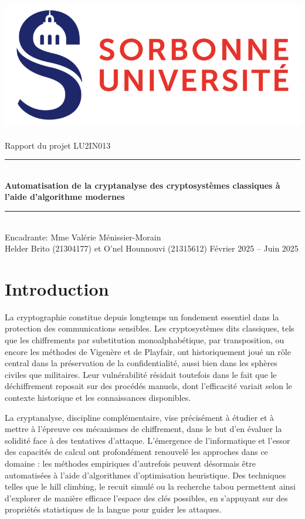\documentclass[a4paper]{article}
\begin{document}
\thispagestyle{plain} 
\begin{titlepage} 
    \begin{center} 
        \bigskip 
        \includegraphics[scale=0.5]{logo_su.jpg}~\\[4cm] 
        {\LARGE Rapport du projet LU2IN013}\\[0.3cm] 
        \rule{\linewidth}{0.5mm} \\[0.6cm] 
        {\huge \textbf{Automatisation de la cryptanalyse des cryptosystèmes classiques à l'aide d'algorithme modernes}}\\[0.4cm] 
        \rule{\linewidth}{0.5mm} \\[1cm] {\large Encadrante: Mme Valérie Ménissier-Morain}\\[4cm] 
        {\Large Helder Brito (21304177) et O'nel Hounnouvi (21315612) }
        \vfill Février 2025 -- Juin 2025
    \end{center} 
\end{titlepage}

\newpage

\tableofcontents

\newpage

\section{Introduction}
La cryptographie constitue depuis longtemps un fondement essentiel dans la protection des communications sensibles. Les cryptosystèmes dits classiques, tels que les chiffrements par substitution monoalphabétique, par transposition, ou encore les méthodes de Vigenère et de Playfair, ont historiquement joué un rôle central dans la préservation de la confidentialité, aussi bien dans les sphères civiles que militaires. Leur vulnérabilité résidait toutefois dans le fait que le déchiffrement reposait sur des procédés manuels, dont l’efficacité variait selon le contexte historique et les connaissances disponibles.

La cryptanalyse, discipline complémentaire, vise précisément à étudier et à mettre à l’épreuve ces mécanismes de chiffrement, dans le but d’en évaluer la solidité face à des tentatives d’attaque. L’émergence de l’informatique et l’essor des capacités de calcul ont profondément renouvelé les approches dans ce domaine : les méthodes empiriques d’autrefois peuvent désormais être automatisées à l’aide d’algorithmes d’optimisation heuristique. Des techniques telles que le hill climbing, le recuit simulé ou la recherche tabou permettent ainsi d’explorer de manière efficace l’espace des clés possibles, en s’appuyant sur des propriétés statistiques de la langue pour guider les attaques.
\end{document}
